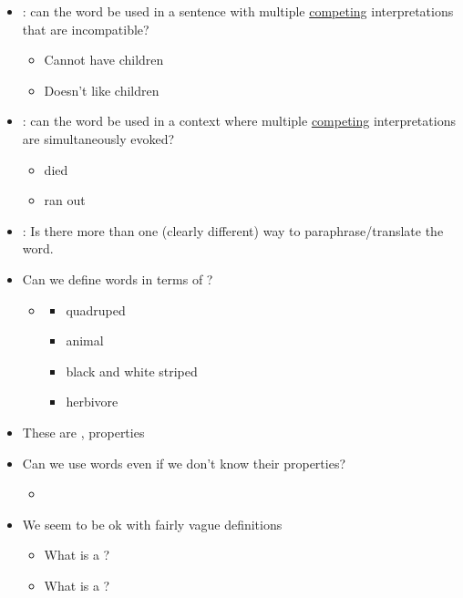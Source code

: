 \documentclass[a4paper,landscape,headrule,footrule,xetex]{foils}
\begin{document}
\begin{itemize}
\item {}: can the word be used in a sentence with
  multiple \underline{competing} interpretations that are incompatible? \\[1ex]
  \begin{itemize}
  \item Cannot have children
  \item Doesn't like children
  \end{itemize}
\item {}: can the word be used in a context where multiple
  \underline{competing} interpretations are simultaneously evoked? \\[1ex]
    \begin{itemize}
    \item died
    \item ran out
    \end{itemize}
  \task
  \item  {}: Is there more than one (clearly different) way to paraphrase/translate the word.
  \end{itemize}


\begin{itemize}
\item Can we define words in terms of ?
  \begin{itemize}
  \item {}
    \begin{itemize}
    \item quadruped
    \item animal 
    \item black and white striped
    \item herbivore
    \end{itemize}
  \end{itemize}
\item These are ,  properties
\item Can we use words even if we don't know their properties?
  \begin{itemize}
  \item {}
  \end{itemize}
\item We seem to be ok with fairly vague definitions
  \begin{itemize}
  \item What is a ? \task
  \item What is a ? \task
  \end{itemize}
\end{itemize}
\end{document}
